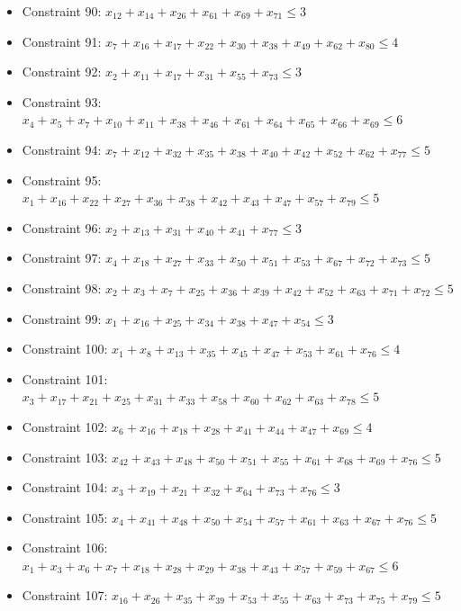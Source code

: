 \documentclass[11pt]{article}
\begin{document}
\begin{itemize}
\item Constraint 90: $x_{12} + x_{14} + x_{26} + x_{61} + x_{69} + x_{71} \le 3$
\item Constraint 91: $x_{7} + x_{16} + x_{17} + x_{22} + x_{30} + x_{38} + x_{49} + x_{62} + x_{80} \le 4$
\item Constraint 92: $x_{2} + x_{11} + x_{17} + x_{31} + x_{55} + x_{73} \le 3$
\item Constraint 93: $x_{4} + x_{5} + x_{7} + x_{10} + x_{11} + x_{38} + x_{46} + x_{61} + x_{64} + x_{65} + x_{66} + x_{69} \le 6$
\item Constraint 94: $x_{7} + x_{12} + x_{32} + x_{35} + x_{38} + x_{40} + x_{42} + x_{52} + x_{62} + x_{77} \le 5$
\item Constraint 95: $x_{1} + x_{16} + x_{22} + x_{27} + x_{36} + x_{38} + x_{42} + x_{43} + x_{47} + x_{57} + x_{79} \le 5$
\item Constraint 96: $x_{2} + x_{13} + x_{31} + x_{40} + x_{41} + x_{77} \le 3$
\item Constraint 97: $x_{4} + x_{18} + x_{27} + x_{33} + x_{50} + x_{51} + x_{53} + x_{67} + x_{72} + x_{73} \le 5$
\item Constraint 98: $x_{2} + x_{3} + x_{7} + x_{25} + x_{36} + x_{39} + x_{42} + x_{52} + x_{63} + x_{71} + x_{72} \le 5$
\item Constraint 99: $x_{1} + x_{16} + x_{25} + x_{34} + x_{38} + x_{47} + x_{54} \le 3$
\item Constraint 100: $x_{1} + x_{8} + x_{13} + x_{35} + x_{45} + x_{47} + x_{53} + x_{61} + x_{76} \le 4$
\item Constraint 101: $x_{3} + x_{17} + x_{21} + x_{25} + x_{31} + x_{33} + x_{58} + x_{60} + x_{62} + x_{63} + x_{78} \le 5$
\item Constraint 102: $x_{6} + x_{16} + x_{18} + x_{28} + x_{41} + x_{44} + x_{47} + x_{69} \le 4$
\item Constraint 103: $x_{42} + x_{43} + x_{48} + x_{50} + x_{51} + x_{55} + x_{61} + x_{68} + x_{69} + x_{76} \le 5$
\item Constraint 104: $x_{3} + x_{19} + x_{21} + x_{32} + x_{64} + x_{73} + x_{76} \le 3$
\item Constraint 105: $x_{4} + x_{41} + x_{48} + x_{50} + x_{54} + x_{57} + x_{61} + x_{63} + x_{67} + x_{76} \le 5$
\item Constraint 106: $x_{1} + x_{3} + x_{6} + x_{7} + x_{18} + x_{28} + x_{29} + x_{38} + x_{43} + x_{57} + x_{59} + x_{67} \le 6$
\item Constraint 107: $x_{16} + x_{26} + x_{35} + x_{39} + x_{53} + x_{55} + x_{63} + x_{73} + x_{75} + x_{79} \le 5$

\end{itemize}
\end{document}
